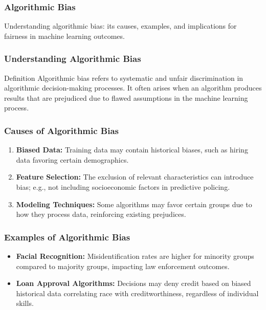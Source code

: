\documentclass[aspectratio=169]{beamer}
\begin{document}
\begin{frame}[fragile]
    \frametitle{Algorithmic Bias}
    Understanding algorithmic bias: its causes, examples, and implications for fairness in machine learning outcomes.
\end{frame}

\begin{frame}[fragile]
    \frametitle{Understanding Algorithmic Bias}
    \begin{block}{Definition}
        Algorithmic bias refers to systematic and unfair discrimination in algorithmic decision-making processes. 
        It often arises when an algorithm produces results that are prejudiced due to flawed assumptions in the machine learning process.
    \end{block}
\end{frame}

\begin{frame}[fragile]
    \frametitle{Causes of Algorithmic Bias}
    \begin{enumerate}
        \item \textbf{Biased Data:} Training data may contain historical biases, such as hiring data favoring certain demographics.
        \item \textbf{Feature Selection:} The exclusion of relevant characteristics can introduce bias; e.g., not including socioeconomic factors in predictive policing.
        \item \textbf{Modeling Techniques:} Some algorithms may favor certain groups due to how they process data, reinforcing existing prejudices.
    \end{enumerate}
\end{frame}

\begin{frame}[fragile]
    \frametitle{Examples of Algorithmic Bias}
    \begin{itemize}
        \item \textbf{Facial Recognition:} Misidentification rates are higher for minority groups compared to majority groups, impacting law enforcement outcomes.
        \item \textbf{Loan Approval Algorithms:} Decisions may deny credit based on biased historical data correlating race with creditworthiness, regardless of individual skills.
    \end{itemize}
\end{frame}
\end{document}
